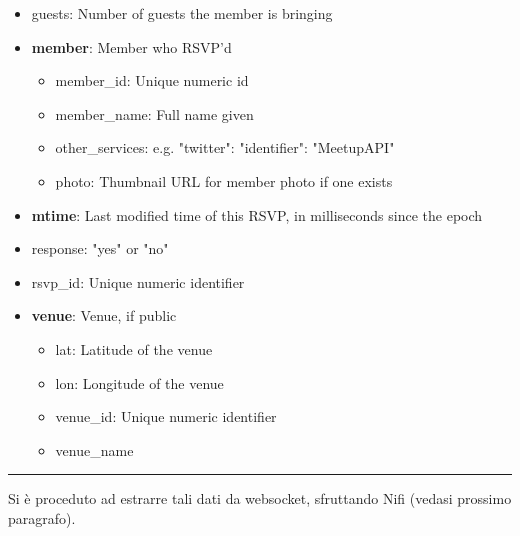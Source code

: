 \documentclass[fleqn,10pt]{SelfArx} %
\begin{document}
{\begin{itemize}[noitemsep]
\begin{itemize}[noitemsep]
    \item group\_urlname: Unique portion of group's URL, no slashes
	\end{itemize}
\item guests: Number of guests the member is bringing
\item \textbf{member}: Member who RSVP'd
	\begin{itemize}[noitemsep]
    \item member\_id: Unique numeric id
    \item member\_name: Full name given
    \item other\_services: e.g. {"twitter": {"identifier": "MeetupAPI"}}
    \item photo: Thumbnail URL for member photo if one exists
	\end{itemize}
\item \textbf{mtime}: Last modified time of this RSVP, in milliseconds since the epoch
\item response: "yes" or "no"
\item rsvp\_id: Unique numeric identifier
\item \textbf{venue}: Venue, if public
	\begin{itemize}[noitemsep]
    \item lat: Latitude of the venue
    \item lon: Longitude of the venue
    \item venue\_id: Unique numeric identifier
    \item venue\_name
	\end{itemize}    
\end{itemize}
\hrule
\vspace*{0.2cm}
Si è proceduto ad estrarre tali dati da websocket, sfruttando Nifi (vedasi prossimo paragrafo).
}
\end{document}
